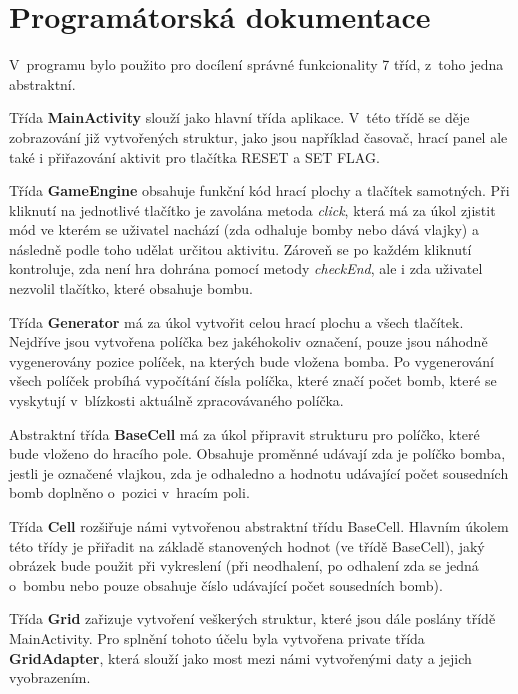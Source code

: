 \documentclass[12pt, a4paper]{article}
\begin{document}
\section{Programátorská dokumentace}
V~programu bylo použito pro docílení správné funkcionality 7 tříd, z~toho jedna abstraktní.
\par
Třída \textbf{MainActivity} slouží jako hlavní třída aplikace. V~této třídě se děje zobrazování již vytvořených struktur, jako jsou například časovač, hrací panel ale také i přiřazování aktivit pro tlačítka RESET a SET FLAG.
\par
Třída \textbf{GameEngine} obsahuje funkční kód hrací plochy a tlačítek samotných. Při kliknutí na jednotlivé tlačítko je zavolána metoda \textit{click}, která má za úkol zjistit mód ve kterém se uživatel nachází (zda odhaluje bomby nebo dává vlajky) a následně podle toho udělat určitou aktivitu. Zároveň se po každém kliknutí kontroluje, zda není hra dohrána pomocí metody \textit{checkEnd}, ale i zda uživatel nezvolil tlačítko, které obsahuje bombu.
\par
Třída \textbf{Generator} má za úkol vytvořit celou hrací plochu a všech tlačítek. Nejdříve jsou vytvořena políčka bez jakéhokoliv označení, pouze jsou náhodně vygenerovány pozice políček, na kterých bude vložena bomba. Po vygenerování všech políček probíhá vypočítání čísla políčka, které značí počet bomb, které se vyskytují v~blízkosti aktuálně zpracovávaného políčka.
\par
Abstraktní třída \textbf{BaseCell} má za úkol připravit strukturu pro políčko, které bude vloženo do hracího pole. Obsahuje proměnné udávají zda je políčko bomba, jestli je označené vlajkou, zda je odhaledno a hodnotu udávající počet sousedních bomb doplněno o~pozici v~hracím poli.
\par
Třída \textbf{Cell} rozšiřuje námi vytvořenou abstraktní třídu BaseCell. Hlavním úkolem této třídy je přiřadit na základě stanovených hodnot (ve třídě BaseCell), jaký obrázek bude použit při vykreslení (při neodhalení, po odhalení zda se jedná o~bombu nebo pouze obsahuje číslo udávající počet sousedních bomb).
\par
Třída \textbf{Grid} zařizuje vytvoření veškerých struktur, které jsou dále poslány třídě MainActivity. Pro splnění tohoto účelu byla vytvořena private třída \textbf{GridAdapter}, která slouží jako most mezi námi vytvořenými daty a jejich vyobrazením.
\newpage
\end{document}
